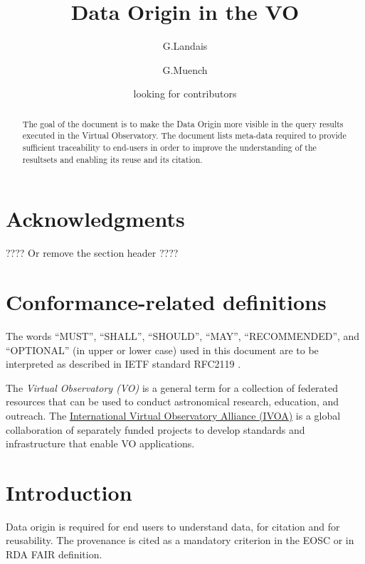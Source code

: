 \documentclass[11pt,a4paper]{ivoa}
\title{Data Origin in the VO}
\author{G.Landais}
\author{G.Muench}
\author{looking for contributors}
\begin{document}
\begin{abstract}
The goal of the document is to make the Data Origin more visible in the query results executed in the Virtual Observatory. 
The document lists meta-data required to provide sufficient traceability to end-users in order to improve the understanding 
of the resultsets and enabling its reuse and its citation.

\end{abstract}


\section*{Acknowledgments}

???? Or remove the section header ????

\section*{Conformance-related definitions}

The words ``MUST'', ``SHALL'', ``SHOULD'', ``MAY'', ``RECOMMENDED'', and
``OPTIONAL'' (in upper or lower case) used in this document are to be
interpreted as described in IETF standard RFC2119 \citep{std:RFC2119}.

The \emph{Virtual Observatory (VO)} is a
general term for a collection of federated resources that can be used
to conduct astronomical research, education, and outreach.
The \href{https://www.ivoa.net}{International
Virtual Observatory Alliance (IVOA)} is a global
collaboration of separately funded projects to develop standards and
infrastructure that enable VO applications.


\section{Introduction}

Data origin is required for end users to understand data, for citation and for reusability. The  provenance is cited as a mandatory criterion in the EOSC or in RDA FAIR definition. 
\end{document}
